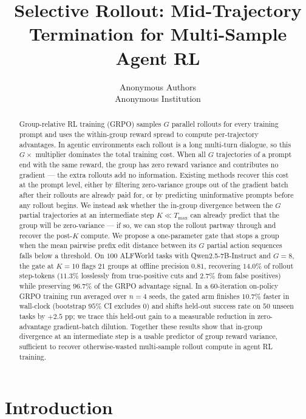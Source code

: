 \documentclass{article}
\title{Selective Rollout: Mid-Trajectory Termination for
Multi-Sample Agent RL}
\author{%
  Anonymous Authors \\
  Anonymous Institution
}
\begin{document}
\maketitle

\begin{abstract}
Group-relative RL training (GRPO) samples $G$ parallel rollouts
for every training prompt and uses the within-group reward spread
to compute per-trajectory advantages. In agentic environments
each rollout is a long multi-turn dialogue, so this $G\!\times$
multiplier dominates the total training cost. When all $G$
trajectories of a prompt end with the same reward, the group has
zero reward variance and contributes no gradient --- the extra
rollouts add no information. Existing methods recover this cost
at the prompt level, either by filtering zero-variance groups
out of the gradient batch after their rollouts are already paid
for, or by predicting uninformative prompts before any rollout
begins. We instead ask whether the in-group divergence between
the $G$ partial trajectories at an intermediate step
$K \!\ll\! T_{\max}$ can already predict that the group will be
zero-variance --- if so, we can stop the rollout partway through
and recover the post-$K$ compute. We propose a one-parameter
gate that stops a group when the mean pairwise prefix edit
distance between its $G$ partial action sequences falls below a
threshold. On $100$ ALFWorld tasks with Qwen2.5-7B-Instruct and
$G\!=\!8$, the gate at $K\!=\!10$ flags $21$ groups at offline
precision $0.81$, recovering $14.0\%$ of rollout step-tokens
($11.3\%$ losslessly from true-positive cuts and $2.7\%$ from
false positives) while preserving $96.7\%$ of the GRPO advantage
signal. In a
$60$-iteration on-policy GRPO training run averaged over $n\!=\!4$
seeds, the gated arm finishes $\mathbf{10.7\%}$ faster in
wall-clock (bootstrap $95\%$ CI excludes $0$) and shifts held-out
success rate on $50$ unseen tasks by $\mathbf{+2.5}$ pp; we trace
this held-out gain to a measurable reduction in zero-advantage
gradient-batch dilution. Together these results show that
in-group divergence at an intermediate step is a usable predictor
of group reward variance, sufficient to recover otherwise-wasted
multi-sample rollout compute in agent RL training.
\end{abstract}


\section{Introduction}
\label{sec:intro}
\end{document}
